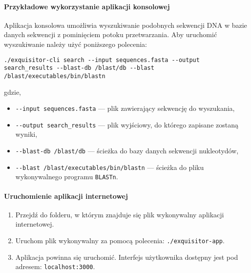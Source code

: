             \paragraph{Przykładowe wykorzystanie aplikacji konsolowej}

                Aplikacja konsolowa umożliwia wyszukiwanie podobnych sekwencji DNA w bazie danych sekwencji z pominięciem potoku przetwarzania. Aby uruchomić wyszukiwanie należy użyć poniższego polecenia:
                
                \texttt{./exquisitor-cli search -\phantom{}-input sequences.fasta -\phantom{}-output search\_results -\phantom{}-blast-db /blast/db -\phantom{}-blast /blast/executables/bin/blastn}

                gdzie,
                \begin{itemize}
                    \item {
                        \texttt{-\phantom{}-input sequences.fasta} — plik zawierający sekwencję do wyszukania,
                    }
                    \item {
                        \texttt{-\phantom{}-output search\_results} — plik wyjściowy, do którego zapisane zostaną wyniki,
                    }
                    \item {
                        \texttt{-\phantom{}-blast-db /blast/db} — ścieżka do bazy danych sekwencji nukleotydów,
                    }
                    \item {
                        \texttt{-\phantom{}-blast /blast/executables/bin/blastn} — ścieżka do pliku wykonywalnego programu \texttt{BLASTn}.
                    }
                \end{itemize}

            \paragraph{Uruchomienie aplikacji internetowej}

                \begin{enumerate}
                    \item {
                        Przejdź do folderu, w którym znajduje się plik wykonywalny aplikacji internetowej.
                    }
                    \item {
                        Uruchom plik wykonywalny za pomocą polecenia: \texttt{./exquisitor-app}.
                    }
                    \item {
                        Aplikacja powinna się uruchomić. Interfejs użytkownika dostępny jest pod adresem: 
                        \texttt{localhost:3000}.
                    }
                \end{enumerate}


